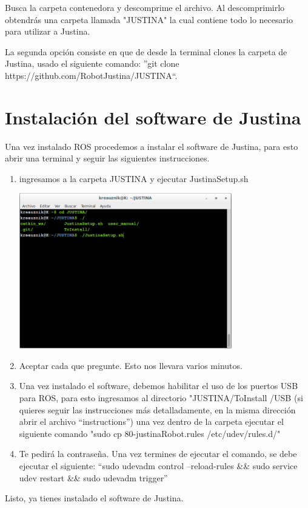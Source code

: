\documentclass[user_manual.tex]{subfiles}
\begin{document}
 Busca la carpeta contenedora y descomprime el archivo. Al descomprimirlo obtendrás una carpeta llamada "JUSTINA" la 
 cual contiene todo lo necesario para utilizar a Justina.
 
 La segunda opción consiste  en que de desde la terminal clones la carpeta de Justina, usado el siguiente comando: ''git clone https://github.com/RobotJustina/JUSTINA``.
 
\section{Instalación del software de Justina}
Una vez instalado ROS procedemos a instalar el software de Justina, para esto abrir una terminal y seguir las siguientes instrucciones.

\begin{enumerate}
 \item ingresamos a la carpeta JUSTINA y ejecutar JustinaSetup.sh
  \begin{center}
\includegraphics[width=0.73\textwidth]{Figures/PP/pp4.png}
\end{center}
 \item Aceptar cada que pregunte. Esto nos llevara varios minutos.
 \item Una vez instalado el software, debemos habilitar el uso de los puertos USB para ROS, para esto ingresamos al directorio "JUSTINA/ToInstall
 /USB (si quieres seguir las instrucciones más detalladamente, en la misma dirección abrir el archivo ``instructions'') una vez dentro
 de la carpeta ejecutar el siguiente comando "sudo cp 80-justinaRobot.rules /etc/udev/rules.d/"
 \item Te pedirá la contraseña. Una vez termines de ejecutar el comando, se debe ejecutar el siguiente: ``sudo udevadm control --reload-rules \&\& sudo service udev restart \&\& sudo udevadm trigger''
\end{enumerate}
Listo, ya tienes instalado el software de Justina.
\end{document}
